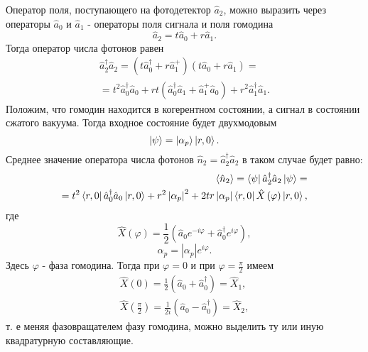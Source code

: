 Оператор поля, поступающего на фотодетектор $\hat{a}_2$, можно выразить
через операторы $\hat{a}_0$ и $\hat{a}_1$ - операторы поля сигнала и
поля гомодина
\begin{equation}
\hat{a}_2 = t \hat{a}_0 + r\hat{a}_1.
\nonumber
\end{equation}
Тогда оператор числа фотонов равен
\begin{eqnarray}
\hat{a}_2^{\dag}\hat{a}_2 = 
\left(t \hat{a}_0^{\dag} + r\hat{a}_1^{+}\right)
\left(t \hat{a}_0 + r\hat{a}_1\right) = 
\nonumber \\
=
t^2\hat{a}_0^{\dag}\hat{a}_0 + r t \left(
\hat{a}_0^{\dag}\hat{a}_1 + \hat{a}_1^{+}\hat{a}_0 
\right) +
r^2\hat{a}_1^{\dag}\hat{a}_1.
\nonumber
\end{eqnarray}
Положим, что гомодин находится в когерентном состоянии, а сигнал в
состоянии сжатого вакуума. Тогда входное состояние будет двухмодовым 
\[
\left|\psi\right> = 
\left|\alpha_p\right> \ket{r, 0}.
\]
Среднее значение оператора числа фотонов $\hat{n}_2 =
\hat{a}_2^{\dag}\hat{a}_2$ в таком случае будет равно:
\begin{eqnarray}
\left<\hat{n}_2\right> = 
\left<\psi\right|\hat{a}_2^{\dag}\hat{a}_2\left|\psi\right> = 
\nonumber \\
=
t^2\bra{r, 0}\hat{a}_0^{\dag}\hat{a}_0\ket{r, 0} + 
r^2 \left|\alpha_p\right|^2 + 2 t r \left|\alpha_p\right|
\bra{r, 0}\hat{X}\left(\varphi\right)\ket{r, 0},
\label{eqPart3SqueezedAdd3}
\end{eqnarray}
где
\[
\hat{X}\left(\varphi\right) = \frac{1}{2}\left(
\hat{a}_0 e^{-i \varphi} +
\hat{a}_0^{\dag} e^{i \varphi}
\right),
\]
\[
\alpha_p = 
\left|\alpha_p\right|
 e^{i \varphi}.
\]
Здесь $\varphi$ - фаза гомодина. Тогда при $\varphi = 0$ и при 
$\varphi = \frac{\pi}{2}$ имеем
\begin{eqnarray}
\hat{X}\left(0\right) = 
\frac{1}{2}\left(\hat{a}_0 + \hat{a}_0^{\dag}\right) = \hat{X}_1,
\nonumber \\
\hat{X}\left(\frac{\pi}{2}\right) = 
\frac{1}{2i}\left(\hat{a}_0 - \hat{a}_0^{\dag}\right) = \hat{X}_2,
\nonumber
\end{eqnarray}
т. е меняя фазовращателем фазу гомодина, можно выделить ту или иную
квадратурную составляющие.

